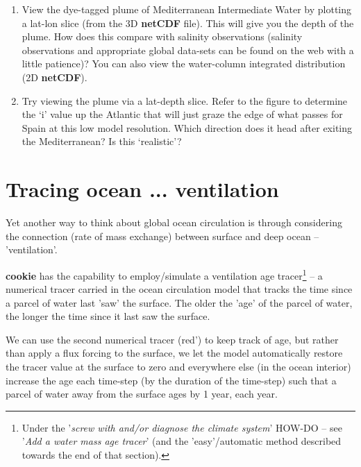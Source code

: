 \vspace{1mm}
\begin{enumerate}[noitemsep]
\vspace{1mm}
\item View the dye-tagged plume of Mediterranean Intermediate Water by plotting a lat-lon slice (from the 3D \textbf{netCDF} file). This will give you the depth of the plume. How does this compare with salinity observations (salinity observations and appropriate global data-sets can be found on the web with a little patience)? You can also view the water-column integrated distribution (2D \textbf{netCDF}).
\vspace{1mm}
\item Try viewing the plume via a lat-depth slice. Refer to the figure to determine the ‘i’ value up the Atlantic that will just graze the edge of what passes for Spain at this low model resolution. Which direction does it head after exiting the Mediterranean? Is this ‘realistic’?
\end{enumerate}
\vspace{1mm}

\newpage

\section{Tracing ocean ... ventilation}

Yet another way to think about global ocean circulation is through considering the connection (rate of mass exchange) between surface and deep ocean -- 'ventilation'.

\textbf{cookie} has the capability to employ/simulate a ventilation age tracer\footnote{Under the '\textit{screw with and/or diagnose the climate system}' HOW-DO -- see '\textit{Add a water mass age tracer}' (and the 'easy'/automatic method described towards the end of that section).} -- a numerical tracer carried in the ocean circulation model that tracks the time since a parcel of water last 'saw' the surface. The older the 'age' of the parcel of water, the longer the time since it last saw the surface.

We can use the second numerical tracer (red') to keep track of age, but rather than apply a flux forcing to the surface, we let the model automatically restore the tracer value at the surface to zero and everywhere else (in the ocean interior) increase the age each time-step (by the duration of the time-step) such that a parcel of water away from the surface ages by 1 year, each year.

